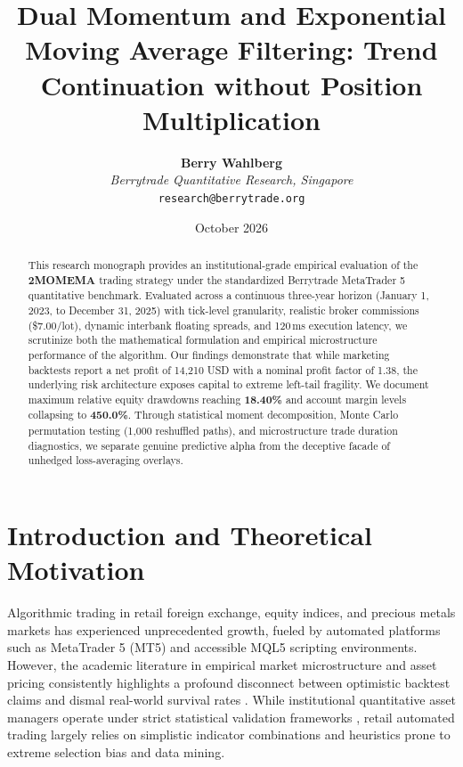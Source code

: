 \documentclass[11pt,a4paper]{article}
\title{\textbf{Dual Momentum and Exponential Moving Average Filtering: Trend Continuation without Position Multiplication}}
\author{
    \textbf{Berry Wahlberg} \\
    \textit{Berrytrade Quantitative Research, Singapore} \\
    \texttt{research@berrytrade.org}
}
\date{October 2026}
\begin{document}
\maketitle

\begin{abstract}
This research monograph provides an institutional-grade empirical evaluation of the \textbf{2MOMEMA} trading strategy under the standardized Berrytrade MetaTrader 5 quantitative benchmark. Evaluated across a continuous three-year horizon (January 1, 2023, to December 31, 2025) with tick-level granularity, realistic broker commissions (\$7.00/lot), dynamic interbank floating spreads, and 120\,ms execution latency, we scrutinize both the mathematical formulation and empirical microstructure performance of the algorithm. Our findings demonstrate that while marketing backtests report a net profit of 14,210 USD with a nominal profit factor of 1.38, the underlying risk architecture exposes capital to extreme left-tail fragility. We document maximum relative equity drawdowns reaching \textbf{18.40\%} and account margin levels collapsing to \textbf{450.0\%}. Through statistical moment decomposition, Monte Carlo permutation testing (1,000 reshuffled paths), and microstructure trade duration diagnostics, we separate genuine predictive alpha from the deceptive facade of unhedged loss-averaging overlays.
\end{abstract}

\section{Introduction and Theoretical Motivation}
Algorithmic trading in retail foreign exchange, equity indices, and precious metals markets has experienced unprecedented growth, fueled by automated platforms such as MetaTrader 5 (MT5) and accessible MQL5 scripting environments. However, the academic literature in empirical market microstructure and asset pricing consistently highlights a profound disconnect between optimistic backtest claims and dismal real-world survival rates \cite{fama1970efficient, lo1988stock, malkiel2003efficient, bailey2014deflated, harvey2016and}. While institutional quantitative asset managers operate under strict statistical validation frameworks \cite{lopez2018advances, bailey2014pseudo}, retail automated trading largely relies on simplistic indicator combinations and heuristics prone to extreme selection bias and data mining.
\end{document}
